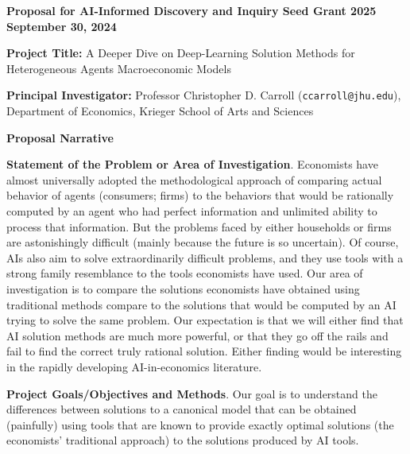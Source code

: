 \documentclass[11pt,pdftex,letterpaper]{article}
\begin{document}
\thispagestyle{empty}

\begin{center}
	\textbf{Proposal for AI-Informed Discovery and Inquiry Seed Grant 2025 \\ September 30, 2024}
\end{center}

\vspace{1.5cm}

\noindent \textbf{Project Title:} A Deeper Dive on Deep-Learning Solution Methods for Heterogeneous Agents Macroeconomic Models

\vspace{1.5cm}

\noindent \textbf{Principal Investigator:} Professor Christopher D. Carroll (\texttt{ccarroll@jhu.edu}), Department of Economics, Krieger School of Arts and Sciences

\newpage
\setcounter{page}{1}

\begin{center}
	\textbf{Proposal Narrative}
      \end{center}

      \textbf{Statement of the Problem or Area of Investigation}. Economists have almost universally adopted the methodological approach of comparing actual behavior of agents (consumers; firms) to the behaviors that would be rationally computed by an agent who had perfect information and unlimited ability to process that information. But the problems faced by either households or firms are astonishingly difficult (mainly because the future is so uncertain). Of course, AIs also aim to solve extraordinarily difficult problems, and they use tools with a strong family resemblance to the tools economists have used. Our area of investigation is to compare the solutions economists have obtained using traditional methods compare to the solutions that would be computed by an AI trying to solve the same problem. Our expectation is that we will either find that AI solution methods are much more powerful, or that they go off the rails and fail to find the correct truly rational solution. Either finding would be interesting in the rapidly developing AI-in-economics literature.

      \textbf{Project Goals/Objectives and Methods}.  Our goal is to understand the differences between solutions to a canonical model that can be obtained (painfully) using tools that are known to provide exactly optimal solutions (the economists' traditional approach) to the solutions produced by AI tools.  
\end{document}
